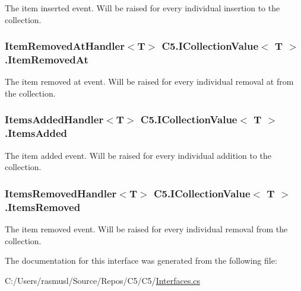 The item inserted event. Will be raised for every individual insertion to the collection. 

\hypertarget{interface_c5_1_1_i_collection_value_aeb3b4f97b700058c5196d7a8d1241ede}{}
\subsubsection[{Item\+Removed\+At}]{\setlength{\rightskip}{0pt plus 5cm}Item\+Removed\+At\+Handler$<$T$>$ {\bf C5.\+I\+Collection\+Value}$<$ T $>$.Item\+Removed\+At}\label{interface_c5_1_1_i_collection_value_aeb3b4f97b700058c5196d7a8d1241ede}


The item removed at event. Will be raised for every individual removal at from the collection. 

\hypertarget{interface_c5_1_1_i_collection_value_a22cf109895d493a5627162f7b5c4041b}{}
\subsubsection[{Items\+Added}]{\setlength{\rightskip}{0pt plus 5cm}Items\+Added\+Handler$<$T$>$ {\bf C5.\+I\+Collection\+Value}$<$ T $>$.Items\+Added}\label{interface_c5_1_1_i_collection_value_a22cf109895d493a5627162f7b5c4041b}


The item added event. Will be raised for every individual addition to the collection. 

\hypertarget{interface_c5_1_1_i_collection_value_a5c228bd1f7d517ff48ab6dfc19965c25}{}
\subsubsection[{Items\+Removed}]{\setlength{\rightskip}{0pt plus 5cm}Items\+Removed\+Handler$<$T$>$ {\bf C5.\+I\+Collection\+Value}$<$ T $>$.Items\+Removed}\label{interface_c5_1_1_i_collection_value_a5c228bd1f7d517ff48ab6dfc19965c25}


The item removed event. Will be raised for every individual removal from the collection. 



The documentation for this interface was generated from the following file\+:\begin{DoxyCompactItemize}
\item 
C\+:/\+Users/rasmusl/\+Source/\+Repos/\+C5/\+C5/\hyperlink{_interfaces_8cs}{Interfaces.\+cs}\end{DoxyCompactItemize}
